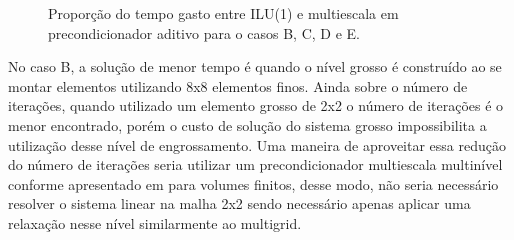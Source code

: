 \begin{figure}[h]
\center
{}
\qquad
{}
\qquad
{}
\caption{Proporção do tempo gasto entre ILU(1) e multiescala em precondicionador aditivo para o casos B, C, D e E.  }
\label{fig:proporcaoPrecondicionador}
\end{figure}


No caso B, a solução de menor tempo é quando o nível grosso é construído ao se montar elementos utilizando 8x8 elementos finos. Ainda sobre o número de iterações, quando utilizado um elemento grosso de 2x2 o número de iterações é o menor encontrado, porém o custo de solução do sistema grosso impossibilita a utilização desse nível de engrossamento. Uma maneira de aproveitar essa redução do número de iterações seria utilizar um precondicionador multiescala multinível conforme apresentado em \cite{multilevel} para volumes finitos, desse modo, não seria necessário resolver o sistema linear na malha 2x2 sendo necessário apenas aplicar uma relaxação nesse nível similarmente ao multigrid.

